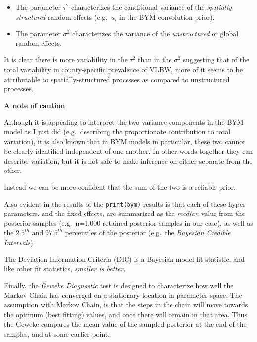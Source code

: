 \documentclass[
]{book}
\providecommand{\tightlist}{%
  \setlength{\itemsep}{0pt}\setlength{\parskip}{0pt}}
\newenvironment{rmdcaution}[1]
  {
  \begin{itemize}
  \renewcommand{\labelitemi}{
    \raisebox{-.7\height}[0pt][0pt]{
      {\setkeys{Gin}{width=3em,keepaspectratio}\texttt{[image: images/\#1]}}
    }
  }
  \setlength{\fboxsep}{1em}
  \begin{caution}
  \item
  }
  {
  \end{caution}
  \end{itemize}
  }
\begin{document}
\begin{itemize}
\tightlist
\item
  The parameter \(\tau^2\) characterizes the conditional variance of the \emph{spatially structured} random effects (e.g.~\(u_i\) in the BYM convolution prior).
\item
  The parameter \(\sigma^2\) characterizes the variance of the \emph{unstructured} or global random effects.
\end{itemize}

It is clear there is more variability in the \(\tau^2\) than in the \(\sigma^2\) suggesting that of the total variability in county-specific prevalence of VLBW, more of it seems to be attributable to spatially-structured processes as compared to unstructured processes.

\begin{rmdcaution}{caution}
\textbf{A note of caution}

Although it is appealing to interpret the two variance components in the BYM model as I just did (e.g.~describing the proportionate contribution to total variation), it is also known that in BYM models in particular, these two cannot be clearly identified independent of one another. In other words together they can describe variation, but it is not safe to make inference on either separate from the other.

Instead we can be more confident that the sum of the two is a reliable prior.

\end{rmdcaution}

Also evident in the results of the \texttt{print(bym)} results is that each of these hyper parameters, and the fixed-effects, are summarized as the \emph{median} value from the posterior samples (e.g.~n=1,000 retained posterior samples in our case), as well as the \(2.5^{th}\) and \(97.5^{th}\) percentiles of the posterior (e.g.~the \emph{Bayesian Credible Intervals}).

The Deviation Information Criteria (DIC) is a Bayesian model fit statistic, and like other fit statistics, \emph{smaller is better}.

Finally, the \emph{Geweke Diagnostic} test is designed to characterize how well the Markov Chain has converged on a stationary location in parameter space. The assumption with Markov Chain, is that the steps in the chain will move towards the optimum (best fitting) values, and once there will remain in that area. Thus the Geweke compares the mean value of the sampled posterior at the end of the samples, and at some earlier point.
\end{document}
